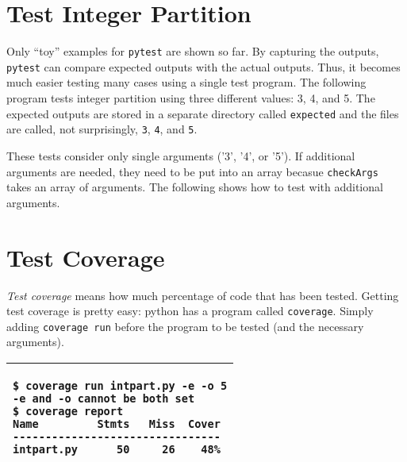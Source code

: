 {\section{Test Integer Partition}

Only ``toy'' examples for {\tt pytest} are shown so far.  By capturing
the outputs, {\tt pytest} can compare expected outputs with the actual
outputs.  Thus, it becomes much easier testing many cases using a
single test program. The following program tests integer partition
using three different values: 3, 4, and 5. The expected outputs are
stored in a separate directory called {\tt expected} and the files are
called, not surprisingly, {\tt 3}, {\tt 4}, and {\tt 5}.

\resetlinenumber[1]
\linenumbers
\begin{tt}
  
\end{tt}
\nolinenumbers

These tests consider only single arguments ('3', '4', or '5').  If
additional arguments are needed, they need to be put into an array
becasue {\tt checkArgs} takes an array of arguments.
The following shows how to test with additional arguments.

\resetlinenumber[1]
\linenumbers
\begin{tt}
  
\end{tt}
\nolinenumbers
\label{page:test_intpart2.py}

\section{Test Coverage}



{\it Test coverage} means how much percentage of code that has been
tested.  Getting test coverage is pretty easy: python has a program
called {\tt coverage}. Simply adding {\tt coverage run} before the
program to be tested (and the necessary arguments).


\vspace{0.2in}

\noindent
\begin{tabular}{|p{5in}|}\hline
\begin{verbatim}
$ coverage run intpart.py -e -o 5
-e and -o cannot be both set
$ coverage report
Name         Stmts   Miss  Cover
--------------------------------
intpart.py      50     26    48%
\end{verbatim}
\\ \hline
\end{tabular}
\vspace{0.2in}

}
